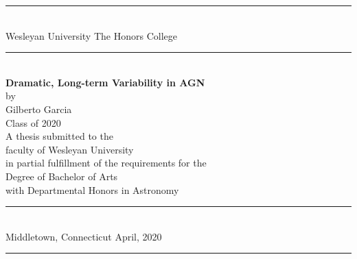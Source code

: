 \documentclass[12pt,oneside]{book}
\begin{document}
\pagestyle{empty}
\begin{titlepage}
\begin{center}
\rule{5.75in}{1pt} \\
\vspace*{-0.125in}
{\large \doublespacing Wesleyan University} \hfill {\large \doublespacing The Honors College}
\rule[0.2in]{5.75in}{1pt} \\
\vspace*{0.8in}
{\LARGE \singlespacing \bf Dramatic, Long-term Variability in AGN} \\
\vspace*{0.05in}
\vspace*{0.10in}
{\large \vspace*{0.20in}  \singlespacing by \vspace*{.2in}
\\Gilberto Garcia \\ Class of 2020\\}
\vspace*{0.25in}
\vspace*{0.8in}
{\large \singlespacing A thesis submitted to the\\ faculty of Wesleyan University\\ in partial fulfillment of the requirements for the \\ Degree of Bachelor of Arts\\ with Departmental Honors in Astronomy\\ \vspace*{-0.15in} }
\vspace*{.25in}
\rule{5.75in}{1pt} \\
\vspace*{-0.125in}
{\large \doublespacing Middletown, Connecticut \hfill April, 2020}
\rule[0.2in]{5.75in}{1pt} \\
\end{center}
\end{titlepage}



\pagestyle{empty}



\end{document}
